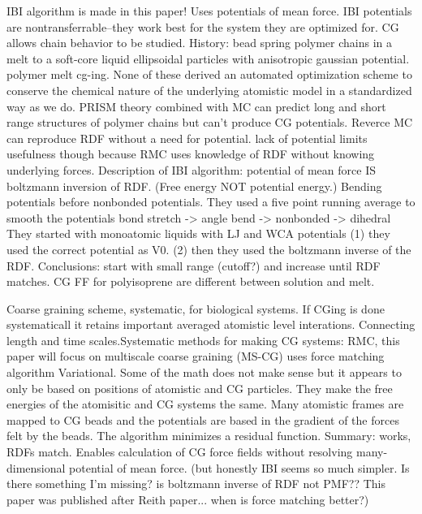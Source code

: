 \documentclass{article}
\begin{document}
\cite{Reith2003a}

IBI algorithm is made in this paper! Uses potentials of mean force. IBI potentials are nontransferrable--they work best for the system they are optimized for.
CG allows chain behavior to be studied. History: bead spring polymer chains in a melt to a soft-core liquid ellipsoidal particles with anisotropic gaussian potential. polymer melt cg-ing. None of these derived an automated optimization scheme to conserve the chemical nature of the underlying atomistic model in a standardized way as we do.
PRISM theory combined with MC can predict long and short range structures of polymer chains but can't produce CG potentials.
Reverce MC can reproduce RDF without a need for potential. lack of potential limits usefulness though because RMC uses knowledge of RDF without knowing underlying forces.
Description of IBI algorithm: potential of mean force IS boltzmann inversion of RDF. (Free energy NOT potential energy.) Bending potentials before nonbonded potentials.
They used a five point running average to smooth the potentials
bond stretch -> angle bend -> nonbonded -> dihedral
They started with monoatomic liquids with LJ and WCA potentials (1) they used the correct potential as V0. (2) then they used the boltzmann inverse of the RDF. 
Conclusions:
start with small range (cutoff?) and increase until RDF matches. CG FF for polyisoprene are different between solution and melt.

\cite{Ayton2007a}

Coarse graining scheme, systematic, for biological systems.
If CGing is done systematicall it retains important averaged atomistic level interations. Connecting length and time scales.Systematic methods for making CG systems: RMC, this paper will focus on multiscale coarse graining (MS-CG) uses force matching algorithm
Variational. Some of the math does not make sense but it appears to only be based on positions of atomistic and CG particles. They make the free energies of the atomisitic and CG systems the same. Many atomistic frames are mapped to CG beads and the potentials are based in the gradient of the forces felt by the beads. The algorithm minimizes a residual function.
Summary: works, RDFs match. Enables calculation of CG force fields without resolving many-dimensional potential of mean force. (but honestly IBI seems so much simpler. Is there something I'm missing? is boltzmann inverse of RDF not PMF?? This paper was published after Reith paper... when is force matching better?)


\cite{Peter2009d}
\end{document}
